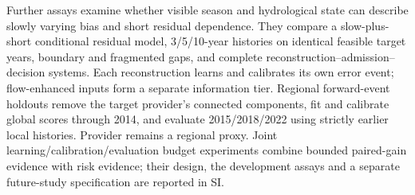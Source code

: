 Further assays examine whether visible season and hydrological state can describe slowly varying bias and short residual dependence. They compare a slow-plus-short conditional residual model, 3/5/10-year histories on identical feasible target years, boundary and fragmented gaps, and complete reconstruction--admission--decision systems. Each reconstruction learns and calibrates its own error event; flow-enhanced inputs form a separate information tier. Regional forward-event holdouts remove the target provider's connected components, fit and calibrate global scores through 2014, and evaluate 2015/2018/2022 using strictly earlier local histories. Provider remains a regional proxy. Joint learning/calibration/evaluation budget experiments combine bounded paired-gain evidence \cite{hoeffding1963} with risk evidence; their design, the development assays and a separate future-study specification are reported in SI.
